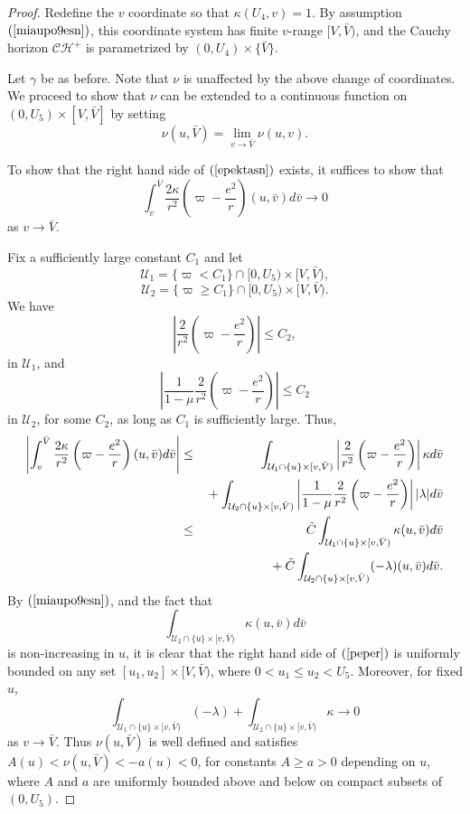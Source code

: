 \documentclass{article}
\begin{document}
{\begin{proof}
Redefine the $v$ coordinate so that
$\kappa(U_4,v)=1$. By assumption $(\ref{miaupo9esn})$, this
coordinate system has finite $v$-range $[V,\bar{V})$, and the 
Cauchy horizon $\mathcal{CH}^+$
is parametrized by $(0,U_4)\times\{\bar{V}\}$.

Let $\gamma$ be as before. Note that $\nu$ is unaffected by the
above change of
coordinates.
We proceed to show that $\nu$ can be extended to a continuous
function on
$(0,U_5)\times[V,\bar{V}]$
by setting 
\begin{equation}
\label{epektasn}
\nu(u,\bar{V})=\lim_{v\to\bar{V}}\nu(u,v).
\end{equation}

To show that the right hand side of $(\ref{epektasn})$ exists,
it suffices to show that
\begin{equation}
\label{stomndev}
\int_v^{\bar{V}}{
\frac{2\kappa}{r^2}\left(\varpi-\frac{e^2}r\right)(u,\bar{v})d\bar{v}}\to0
\end{equation}
as $v\to\bar{V}$. 

Fix a sufficiently large constant $C_1$ and let 
\[
\mathcal{U}_1=\{\varpi< C_1\}\cap[0,U_5)\times[V,\bar{V}),
\]
\[
\mathcal{U}_2=\{\varpi\ge C_1\}\cap[0,U_5)\times[V,\bar{V}).
\]
We have
\[
\left|\frac{2}{r^2}\left(\varpi-\frac{e^2}r\right)\right|\le C_2,
\]
in $\mathcal{U}_1$,
and
\[
\left|\frac{1}{1-\mu}\frac{2}{r^2}\left(\varpi-\frac{e^2}r\right)\right|\le C_2
\]
in $\mathcal{U}_2$, for some $C_2$, as long as $C_1$ is sufficiently large.
Thus,
\begin{eqnarray}
\label{peper}
\nonumber
\left|\int_v^{\bar{V}}\frac{2\kappa}{r^2}\left(\varpi-\frac{e^2}r\right)(u,\bar{v})d\bar{v}
\right|&\le&
\int_{\mathcal{U}_1\cap\{u\}\times[v,\bar{V})}{
\left|\frac2{r^2}\left(\varpi-\frac{e^2}r\right)\right|\kappa d\bar{v}}
\\
\nonumber
&&\hbox{}+
\int_{\mathcal{U}_2\cap\{u\}\times[v,\bar{V})}
\left|\frac{1}{1-\mu}\frac{2}{r^2}\left(\varpi-\frac{e^2}r\right)\right|
|\lambda| d\bar{v}\\
&\le&
\tilde{C}\int_{\mathcal{U}_1\cap\{u\}\times[v,\bar{V})}\kappa(u,\bar{v})d\bar{v}\\
&&\hbox{}+
\tilde{C}\int_{\mathcal{U}_2\cap\{u\}\times[v,\bar{V})}(-\lambda)(u,\bar{v})d\bar{v}.
\end{eqnarray}
By $(\ref{miaupo9esn})$,
and the fact that
\begin{equation}
\label{nonin}
\int_{\mathcal{U}_2\cap\{u\}\times[v,\bar{V})}\kappa(u,\bar{v})d\bar{v} 
\end{equation}
is non-increasing in $u$, it
is clear that the
right hand side of $(\ref{peper})$ is uniformly bounded on
any set $[u_1,u_2]\times[V,\bar{V})$, where $0<u_1\le u_2<U_5$. 
Moreover, for fixed $u$,
\[
\int_{\mathcal{U}_1\cap\{u\}\times[v,\bar{V})}(-\lambda)+
\int_{\mathcal{U}_2\cap\{u\}\times[v,\bar{V})}\kappa\to0
\]
as $v\to\bar{V}$. Thus $\nu(u,\bar{V})$ is well defined and satisfies
$A(u)<\nu(u,\bar{V})<-a(u)<0$, for constants $A\ge a>0$ depending on $u$, where
$A$ and $a$ are uniformly bounded above and below on compact subsets of $(0,U_5)$.


\end{proof}}
\end{document}
